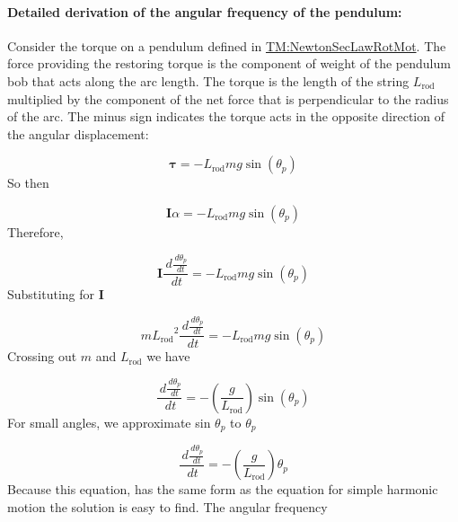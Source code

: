 \documentclass[12pt]{article}
\begin{document}
\paragraph{Detailed derivation of the angular frequency of the pendulum:}
\label{GD:angFrequencyGDDeriv}
Consider the torque on a pendulum defined in \hyperref[TM:NewtonSecLawRotMot]{TM:NewtonSecLawRotMot}. The force providing the restoring torque is the component of weight of the pendulum bob that acts along the arc length. The torque is the length of the string ${L_{\text{rod}}}$ multiplied by the component of the net force that is perpendicular to the radius of the arc. The minus sign indicates the torque acts in the opposite direction of the angular displacement:

\begin{displaymath}
\symbf{τ}=-{L_{\text{rod}}} m g \sin\left({θ_{p}}\right)
\end{displaymath}
So then

\begin{displaymath}
\symbf{I} α=-{L_{\text{rod}}} m g \sin\left({θ_{p}}\right)
\end{displaymath}
Therefore,

\begin{displaymath}
\symbf{I} \frac{\,d\frac{\,d{θ_{p}}}{\,dt}}{\,dt}=-{L_{\text{rod}}} m g \sin\left({θ_{p}}\right)
\end{displaymath}
Substituting for $\symbf{I}$

\begin{displaymath}
m {L_{\text{rod}}}^{2} \frac{\,d\frac{\,d{θ_{p}}}{\,dt}}{\,dt}=-{L_{\text{rod}}} m g \sin\left({θ_{p}}\right)
\end{displaymath}
Crossing out $m$ and ${L_{\text{rod}}}$ we have

\begin{displaymath}
\frac{\,d\frac{\,d{θ_{p}}}{\,dt}}{\,dt}=-\left(\frac{g}{{L_{\text{rod}}}}\right) \sin\left({θ_{p}}\right)
\end{displaymath}
For small angles, we approximate sin ${θ_{p}}$ to ${θ_{p}}$

\begin{displaymath}
\frac{\,d\frac{\,d{θ_{p}}}{\,dt}}{\,dt}=-\left(\frac{g}{{L_{\text{rod}}}}\right) {θ_{p}}
\end{displaymath}
Because this equation, has the same form as the equation for simple harmonic motion the solution is easy to find.  The angular frequency
\end{document}
